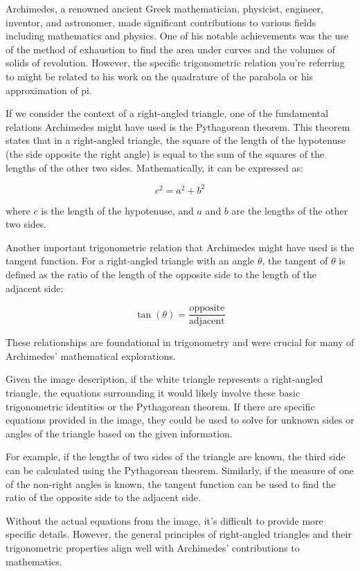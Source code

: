 Archimedes, a renowned ancient Greek mathematician, physicist, engineer, inventor, and astronomer, made significant contributions to various fields including mathematics and physics. One of his notable achievements was the use of the method of exhaustion to find the area under curves and the volumes of solids of revolution. However, the specific trigonometric relation you're referring to might be related to his work on the quadrature of the parabola or his approximation of pi.

If we consider the context of a right-angled triangle, one of the fundamental relations Archimedes might have used is the Pythagorean theorem. This theorem states that in a right-angled triangle, the square of the length of the hypotenuse (the side opposite the right angle) is equal to the sum of the squares of the lengths of the other two sides. Mathematically, it can be expressed as:

\[ c^2 = a^2 + b^2 \]

where \( c \) is the length of the hypotenuse, and \( a \) and \( b \) are the lengths of the other two sides.

Another important trigonometric relation that Archimedes might have used is the tangent function. For a right-angled triangle with an angle \( \theta \), the tangent of \( \theta \) is defined as the ratio of the length of the opposite side to the length of the adjacent side:

\[ \tan(\theta) = \frac{\text{opposite}}{\text{adjacent}} \]

These relationships are foundational in trigonometry and were crucial for many of Archimedes' mathematical explorations.

Given the image description, if the white triangle represents a right-angled triangle, the equations surrounding it would likely involve these basic trigonometric identities or the Pythagorean theorem. If there are specific equations provided in the image, they could be used to solve for unknown sides or angles of the triangle based on the given information.

For example, if the lengths of two sides of the triangle are known, the third side can be calculated using the Pythagorean theorem. Similarly, if the measure of one of the non-right angles is known, the tangent function can be used to find the ratio of the opposite side to the adjacent side.

Without the actual equations from the image, it's difficult to provide more specific details. However, the general principles of right-angled triangles and their trigonometric properties align well with Archimedes' contributions to mathematics.